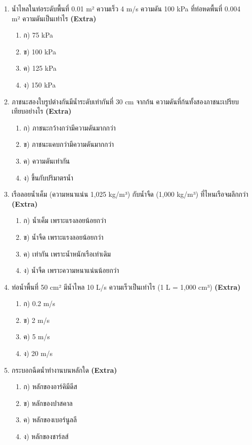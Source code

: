 \documentclass[12pt]{article}
\begin{document}
\begin{enumerate}[label=\arabic*.]
\item น้ำไหลในท่อระดับพื้นที่ 0.01 m² ความเร็ว 4 m/s ความดัน 100 kPa ที่ท่อหดพื้นที่ 0.004 m² ความดันเป็นเท่าไร \hfill \textbf{\small (Extra)}
\begin{enumerate}[label=)]
\item ก) 75 kPa
\item ข) 100 kPa
\item ค) 125 kPa
\item ง) 150 kPa
\end{enumerate}
\item ภาชนะสองใบรูปต่างกันมีน้ำระดับเท่ากันที่ 30 cm จากก้น ความดันที่ก้นทั้งสองภาชนะเปรียบเทียบอย่างไร \hfill \textbf{\small (Extra)}
\begin{enumerate}[label=)]
\item ก) ภาชนะกว้างกว่ามีความดันมากกว่า
\item ข) ภาชนะแคบกว่ามีความดันมากกว่า
\item ค) ความดันเท่ากัน
\item ง) ขึ้นกับปริมาตรน้ำ
\end{enumerate}
\item เรือลอยน้ำเค็ม (ความหนาแน่น 1,025 kg/m³) กับน้ำจืด (1,000 kg/m³) ที่ไหนเรือจมลึกกว่า \hfill \textbf{\small (Extra)}
\begin{enumerate}[label=)]
\item ก) น้ำเค็ม เพราะแรงลอยน้อยกว่า
\item ข) น้ำจืด เพราะแรงลอยน้อยกว่า
\item ค) เท่ากัน เพราะน้ำหนักเรือเท่าเดิม
\item ง) น้ำจืด เพราะความหนาแน่นน้อยกว่า
\end{enumerate}
\item ท่อน้ำพื้นที่ 50 cm² มีน้ำไหล 10 L/s ความเร็วเป็นเท่าไร (1 L = 1,000 cm³) \hfill \textbf{\small (Extra)}
\begin{enumerate}[label=)]
\item ก) 0.2 m/s
\item ข) 2 m/s
\item ค) 5 m/s
\item ง) 20 m/s
\end{enumerate}
\item กระบอกฉีดน้ำทำงานบนหลักใด \hfill \textbf{\small (Extra)}
\begin{enumerate}[label=)]
\item ก) หลักของอาร์คิมีดีส
\item ข) หลักของปาสคาล
\item ค) หลักของเบอร์นูลลี
\item ง) หลักของชาร์ลส์

\end{enumerate}
\end{enumerate}
\end{document}
